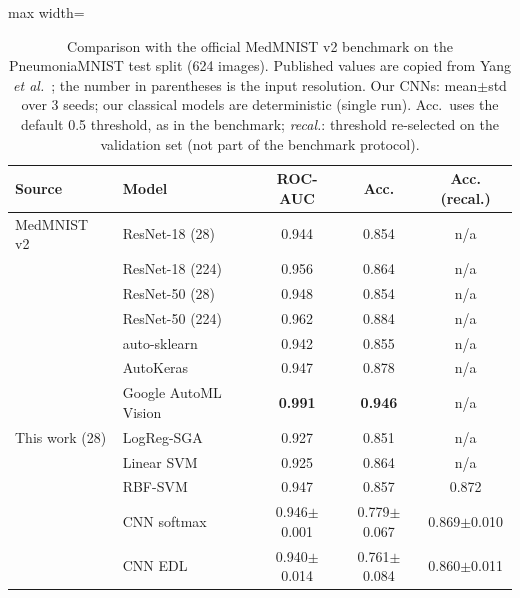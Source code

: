 \begin{table}[t]
\centering
\small
\caption{Comparison with the official MedMNIST v2 benchmark on the PneumoniaMNIST test split (624 images). Published
values are copied from Yang \emph{et al.}~\cite{yang2023medmnist}; the number in parentheses is the input resolution.
Our CNNs: mean$\pm$std over 3 seeds; our classical models are deterministic (single run). Acc.\ uses the default 0.5
threshold, as in the benchmark; \emph{recal.}: threshold re-selected on the validation set (not part of the benchmark protocol).}
\label{tab:benchmark}
\begin{adjustbox}{max width=\textwidth}
\begin{tabular}{llccc}
\toprule
Source & Model & ROC-AUC & Acc. & Acc. (recal.) \\
\midrule
MedMNIST v2~\cite{yang2023medmnist} & ResNet-18 (28) & 0.944 & 0.854 & n/a \\
 & ResNet-18 (224) & 0.956 & 0.864 & n/a \\
 & ResNet-50 (28) & 0.948 & 0.854 & n/a \\
 & ResNet-50 (224) & 0.962 & 0.884 & n/a \\
 & auto-sklearn & 0.942 & 0.855 & n/a \\
 & AutoKeras & 0.947 & 0.878 & n/a \\
 & Google AutoML Vision & \textbf{0.991} & \textbf{0.946} & n/a \\
\midrule
This work (28) & LogReg-SGA & 0.927 & 0.851 & n/a \\
 & Linear SVM & 0.925 & 0.864 & n/a \\
 & RBF-SVM & 0.947 & 0.857 & 0.872 \\
 & CNN softmax & 0.946$\pm$0.001 & 0.779$\pm$0.067 & 0.869$\pm$0.010 \\
 & CNN EDL & 0.940$\pm$0.014 & 0.761$\pm$0.084 & 0.860$\pm$0.011 \\
\bottomrule
\end{tabular}
\end{adjustbox}
\end{table}
